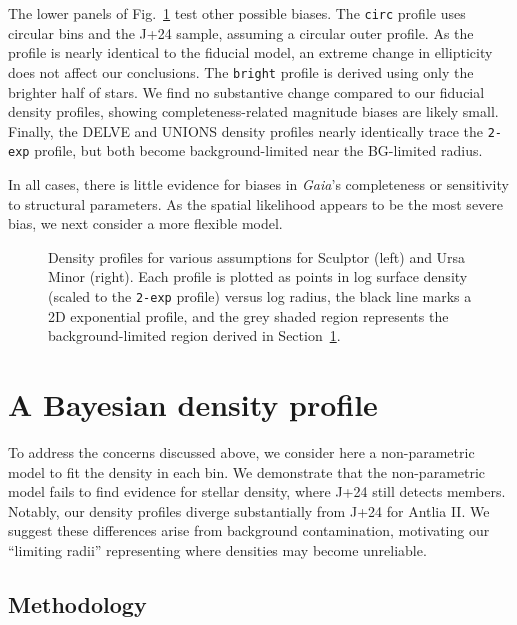 The lower panels of Fig.~\ref{fig:scl_umi_density_extras} test other
possible biases. The \texttt{circ} profile uses circular bins and the
J+24 sample, assuming a circular outer profile. As the profile is nearly
identical to the fiducial model, an extreme change in ellipticity does
not affect our conclusions. The \texttt{bright} profile is derived using
only the brighter half of stars. We find no substantive change compared
to our fiducial density profiles, showing completeness-related magnitude
biases are likely small. Finally, the DELVE and UNIONS density profiles
nearly identically trace the \texttt{2-exp} profile, but both become
background-limited near the BG-limited radius.

In all cases, there is little evidence for biases in \emph{Gaia}'s
completeness or sensitivity to structural parameters. As the spatial
likelihood appears to be the most severe bias, we next consider a more
flexible model.

\begin{figure}
\centering
{}
\caption[Density methodology comparison]{Density profiles for various
assumptions for Sculptor (left) and Ursa Minor (right). Each profile is
plotted as points in log surface density (scaled to the \texttt{2-exp}
profile) versus log radius, the black line marks a 2D exponential
profile, and the grey shaded region represents the background-limited
region derived in
Section~\ref{sec:mcmc_hists}.}\label{fig:scl_umi_density_extras}
\end{figure}

\section{A Bayesian density profile}\label{sec:mcmc_hists}

To address the concerns discussed above, we consider here a
non-parametric model to fit the density in each bin. We demonstrate that
the non-parametric model fails to find evidence for stellar density,
where J+24 still detects members. Notably, our density profiles diverge
substantially from J+24 for Antlia II. We suggest these differences
arise from background contamination, motivating our ``limiting radii''
representing where densities may become unreliable.

\subsection{Methodology}\label{methodology}


